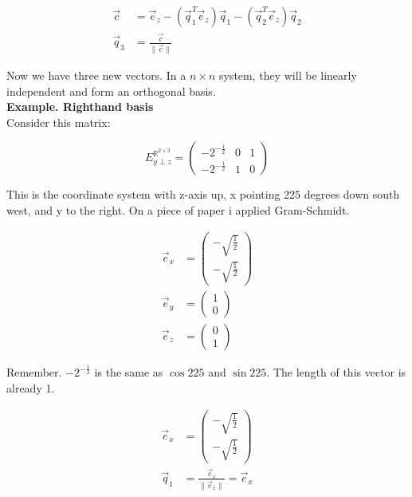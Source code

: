 \documentclass[a4paper]{article}
\begin{document}
\begin{Example}
\begin{PropositionOpt4}
\begin{displaymath}
\begin{align}
\vec{c} &= \vec{e}_{z} - (\vec{q}_{1}^{T}\vec{e}_{z})\vec{q}_{1} - (\vec{q}_{2}^{T}\vec{e}_{z})\vec{q}_{2}\\
\vec{q}_{3} &= \frac{\vec{c}}{\|\vec{c}\|}
\end{align}
\end{displaymath}

Now we have three new vectors. In a $n\times n$ system, they will be linearly independent and form an orthogonal basis.\\


\textbf{Example. Righthand basis}\\

Consider this matrix:

\begin{displaymath}
    E^{\mathbb{R}^{2\times{3}}}_{y\perp z} = \begin{pmatrix}-2^{-\frac12}&0&1\\-2^{-\frac12}&1&0\end{pmatrix}
\end{displaymath}

This is the coordinate system with z-axis up, x pointing 225 degrees down south west, and y to the right.
On a piece of paper i applied Gram-Schmidt.

\begin{displaymath}
\begin{align}
\vec{e}_{x} &= \begin{pmatrix}-\sqrt{\frac12}\\-\sqrt{\frac12}\end{pmatrix}\\
\vec{e}_{y} &= \begin{pmatrix}1\\0\end{pmatrix}\\
\vec{e}_{z} &= \begin{pmatrix}0\\1\end{pmatrix}
\end{align}
\end{displaymath}

Remember. $-2^{-\frac12}$ is the same as $\cos 225$ and $\sin 225$. The length of this vector is already 1.

\begin{displaymath}
\begin{align}
\vec{e}_{x} &= \begin{pmatrix}-\sqrt{\frac12}\\-\sqrt{\frac12}\end{pmatrix}\\
\vec{q}_{1} &= \frac{\vec{e}_{x}}{\|\vec{e}_{x}\|} = \vec{e}_{x}
\end{align}
\end{displaymath}


\end{PropositionOpt4}
\end{Example}
\end{document}

